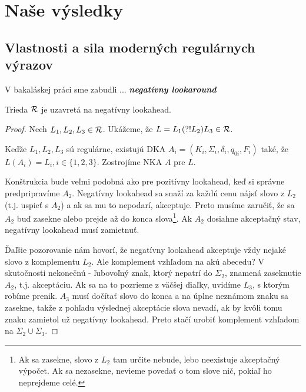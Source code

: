 \chapter{Naše výsledky}
\label{chap:vysledky}

\section[Vlastnosti a sila]{Vlastnosti a sila moderných regulárnych výrazov}
\label{vsila}

V bakaláskej práci sme zabudli ... \textbf{\textit{negatívny lookaround}} \todo

\begin{lema}\label{nla+R}
Trieda ${\cal R}$ je uzavretá na negatívny lookahead.
\end{lema}
\begin{proof}
Nech $L_1,L_2,L_3 \in {\cal R}$. Ukážeme, že $L=L_1(?!L_2)L_3 \in {\cal R}$.

Keďže $ L_{1},L_{2},L_{3} $ sú regulárne, existujú DKA $ A_{i} = (K_{i},\Sigma_{i},\delta_{i},q_{0i},F_{i}) $ také, že $ L(A_{i})=L_{i}, i \in \lbrace 1,2,3\rbrace $. Zostrojíme NKA $A$ pre $L$.

Konštrukcia bude veľmi podobná ako pre pozitívny lookahead, keď si správne predpripravíme $A_2$. Negatívny lookahead sa snaží za každú cenu nájsť slovo z $L_2$ (t.j. uspieť s $A_2$) a ak sa mu to nepodarí, akceptuje. Preto musíme zaručiť, že sa $A_2$ buď zasekne alebo prejde až do konca slova\footnote{Ak sa zasekne, slovo z $L_2$ tam určite nebude, lebo neexistuje akceptačný výpočet. Ak sa nezasekne, nevieme povedať o tom slove nič, pokiaľ ho neprejdeme celé.}. Ak $A_2$ dosiahne akceptačný stav, negatívny lookahead musí zamietnuť. 

Ďaľšie pozorovanie nám hovorí, že negatívny lookahead akceptuje vždy nejaké slovo z komplementu $L_2$. Ale komplement vzhľadom na akú abecedu? V skutočnosti nekonečnú - ľubovoľný znak, ktorý nepatrí do $\Sigma_2$, znamená zaseknutie $A_2$, t.j. akceptáciu. Ak sa na to pozrieme z väčšej ďiaľky, uvidíme $L_3$, s ktorým robíme prenik. $A_3$ musí dočítať slovo do konca a na úplne neznámom znaku sa zasekne, takže z pohľadu výslednej akceptácie slova nevadí, ak by kvôli tomu znaku zamietol už negatívny lookahead. Preto stačí urobiť komplement vzhľadom na $\Sigma_2 \cup \Sigma_3$. 


\end{proof}
